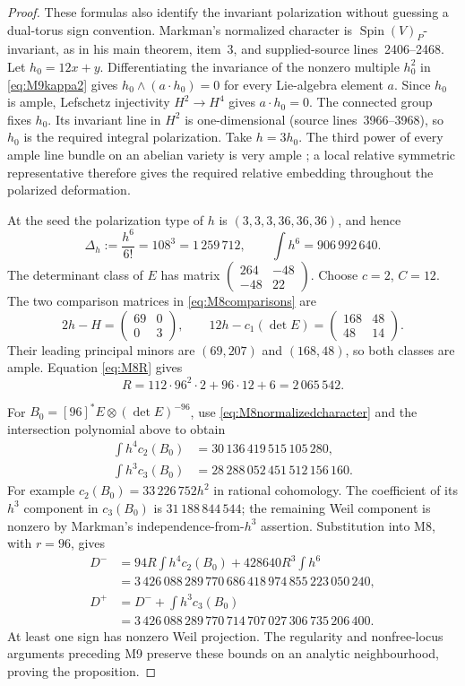 \begin{proof}
These formulas also identify the invariant polarization without
guessing a dual-torus sign convention. Markman's normalized character
is $\operatorname{Spin}(V)_P$-invariant, as in his main theorem,
item~3, and supplied-source lines~2406--2468.
Let $h_0=12x+y$. Differentiating the invariance of the nonzero
multiple $h_0^2$ in \eqref{eq:M9kappa2} gives
$h_0\wedge(a\cdot h_0)=0$ for every Lie-algebra element $a$.
Since $h_0$ is ample, Lefschetz injectivity $H^2\to H^4$ gives
$a\cdot h_0=0$. The connected group fixes $h_0$.
Its invariant line in $H^2$ is one-dimensional
(source lines~3966--3968), so $h_0$ is the required integral
polarization. Take $h=3h_0$. The third power of every ample line bundle
on an abelian variety is very ample
\citep[Theorem~1.1(b)]{BauerSzemberg96}; a local relative symmetric
representative therefore gives the required relative embedding
throughout the polarized deformation.

At the seed the polarization type of $h$ is
$(3,3,3,36,36,36)$, and hence
\[
 \Delta_h:=\frac{h^6}{6!}=108^3=1\,259\,712,\qquad
 \int h^6=906\,992\,640.
\]
The determinant class of $E$ has matrix
$\left(\begin{smallmatrix}264&-48\\-48&22\end{smallmatrix}\right)$.
Choose $c=2$, $C=12$. The two comparison matrices in
\eqref{eq:M8comparisons} are
\[
 2h-H=\begin{pmatrix}69&0\\0&3\end{pmatrix},\qquad
 12h-c_1(\det E)=\begin{pmatrix}168&48\\48&14\end{pmatrix}.
\]
Their leading principal minors are $(69,207)$ and $(168,48)$,
so both classes are ample. Equation \eqref{eq:M8R} gives
\[
 R=112\cdot96^2\cdot2+96\cdot12+6=2\,065\,542.
\]

For $B_0=[96]^*E\otimes(\det E)^{-96}$, use
\eqref{eq:M8normalizedcharacter} and the intersection polynomial
above to obtain
\begin{align*}
 \int h^4c_2(B_0)&=30\,136\,419\,515\,105\,280,\\
 \int h^3c_3(B_0)&=28\,288\,052\,451\,512\,156\,160.
\end{align*}
For example $c_2(B_0)=33\,226\,752h^2$ in rational cohomology.
The coefficient of its $h^3$ component in $c_3(B_0)$ is
$31\,188\,844\,544$; the remaining Weil component is nonzero by
Markman's independence-from-$h^3$ assertion.
Substitution into M8, with $r=96$, gives
\begin{align*}
 D^-&=94R\int h^4c_2(B_0)+428640R^3\int h^6\\
    &=3\,426\,088\,289\,770\,686\,418\,974\,855\,223\,050\,240,\\
 D^+&=D^-+\int h^3c_3(B_0)\\
    &=3\,426\,088\,289\,770\,714\,707\,027\,306\,735\,206\,400.
\end{align*}
At least one sign has nonzero Weil projection.
The regularity and nonfree-locus arguments preceding M9 preserve
these bounds on an analytic neighbourhood, proving the proposition.


\end{proof}
